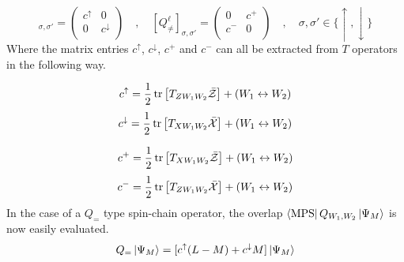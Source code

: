 %
%
\begin{equation}
[Q^{\ell}_{=}]_{\sigma,\sigma'} = \left(\begin{array}{cc}
c^{\uparrow} & 0 \\
0 & c^{\downarrow} \\
\end{array}\right)
%
\quad , \quad
%
[Q^{\ell}_{\neq}]_{\sigma,\sigma'} = \left(\begin{array}{cc}
0 & c^{+} \\
c^{-} & 0 \\
\end{array}\right)
%
\quad , \quad
%
\sigma,\sigma' \in \{ \uparrow, \downarrow \}
\end{equation}
%
%
Where the matrix entries $c^{\uparrow}$, $c^{\downarrow}$, $c^{+}$ and $c^{-}$ can all be extracted from $T$ operators in the following way.

\newpage
%
%
\begin{equation}
c^{\uparrow} = \frac{1}{2} \tr \left[ 
T_{Z W_1 W_2} \mathcal{\bar{Z}}
\right]
+
(W_1 \leftrightarrow W_2)
\end{equation}
%
%
\begin{equation}
c^{\downarrow} = \frac{1}{2} \tr \left[
T_{X W_1 W_2} \mathcal{\bar{X}}
\right]
+
(W_1 \leftrightarrow W_2)
\end{equation}
%
%

%
%
\begin{equation}
c^{+} = \frac{1}{2} \tr \left[ 
T_{X W_1 W_2} \mathcal{\bar{Z}}
\right]
+
(W_1 \leftrightarrow W_2)
\end{equation}
%
%
\begin{equation}
c^{-} = \frac{1}{2} \tr \left[
T_{Z W_1 W_2} \mathcal{\bar{X}}
\right]
+
(W_1 \leftrightarrow W_2)
\end{equation}
%
%
In the case of a $Q_{=}$ type spin-chain operator, the overlap $\bra{\text{MPS}} Q_{W_1,W_2} \ket{\Psi_M}$ is now easily evaluated.
%
%
\begin{equation*}
Q_{=} \ket{\Psi_M} = [c^{\uparrow} (L-M) + c^{\downarrow} M] \ket{\Psi_M}
\end{equation*}
%
%

